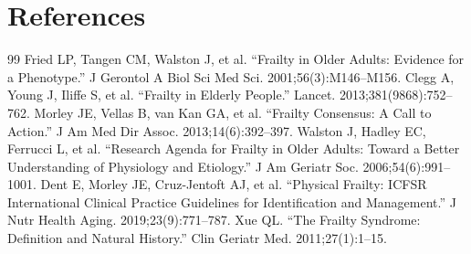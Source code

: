 \section*{References}
\begin{thebibliography}{99}
 Fried LP, Tangen CM, Walston J, et al. ``Frailty in Older Adults: Evidence for a Phenotype.'' J Gerontol A Biol Sci Med Sci. 2001;56(3):M146--M156.
 Clegg A, Young J, Iliffe S, et al. ``Frailty in Elderly People.'' Lancet. 2013;381(9868):752--762.
 Morley JE, Vellas B, van Kan GA, et al. ``Frailty Consensus: A Call to Action.'' J Am Med Dir Assoc. 2013;14(6):392--397.
 Walston J, Hadley EC, Ferrucci L, et al. ``Research Agenda for Frailty in Older Adults: Toward a Better Understanding of Physiology and Etiology.'' J Am Geriatr Soc. 2006;54(6):991--1001.
 Dent E, Morley JE, Cruz-Jentoft AJ, et al. ``Physical Frailty: ICFSR International Clinical Practice Guidelines for Identification and Management.'' J Nutr Health Aging. 2019;23(9):771--787.
 Xue QL. ``The Frailty Syndrome: Definition and Natural History.'' Clin Geriatr Med. 2011;27(1):1--15.
\end{thebibliography}
